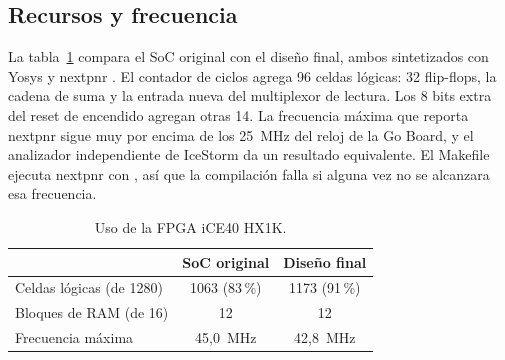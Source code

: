 \subsection{Recursos y frecuencia}

La tabla~\ref{tab:recursos} compara el SoC original con el diseño final, ambos
sintetizados con Yosys y nextpnr \cite{osscad}. El contador de ciclos agrega 96 celdas
lógicas: 32 flip-flops, la cadena de suma y la entrada nueva del multiplexor de lectura.
Los 8 bits extra del reset de encendido agregan otras 14. La frecuencia máxima que reporta
nextpnr sigue muy por encima de los 25~MHz del reloj de la Go Board, y el analizador
independiente  de IceStorm da un resultado equivalente. El Makefile ejecuta nextpnr con , así que la compilación falla
si alguna vez no se alcanzara esa frecuencia.

\begin{table}[H]
\centering
\caption{Uso de la FPGA iCE40 HX1K.}
\label{tab:recursos}
\begin{tabular}{lcc}
\toprule
 & SoC original & Diseño final \\
\midrule
Celdas lógicas (de 1280) & 1063 (83\,\%) & 1173 (91\,\%) \\
Bloques de RAM (de 16) & 12 & 12 \\
Frecuencia máxima & 45,0~MHz & 42,8~MHz \\
\bottomrule
\end{tabular}
\end{table}
